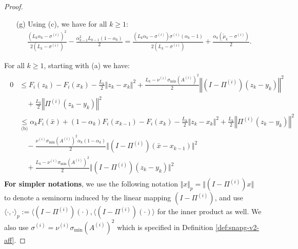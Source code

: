 \documentclass[12pt]{article}
\begin{document}
\begin{proof}
\begin{itemize}
            \item [(g)] Using (c), we have for all $k \ge 1$: 
            \begin{align*}
                \frac{\left(
                    L_k\alpha_k - \sigma^{(i)}
                \right)^2}{2(L_k - \sigma^{(i)})} 
                -
                \frac{\alpha_{k - 1}^2L_{k - 1}(1 - \alpha_k)}{2} 
                = 
                \frac{
                \left(L_k \alpha_k - \sigma^{(i)}\right)\sigma^{(i)}
                \left(\alpha_k - 1\right)
                }
                {2(L_k - \sigma^{(i)})}
                + \frac{\alpha_k(\tilde \mu_k - \sigma^{(i)})}{2}. 
            \end{align*}
        \end{itemize}
        For all $k \ge 1$, starting with (a) we have: 
        \begin{align}\label{ineq:snapg2-one-step-stage1-chain1}
            \begin{split}
                0 &\le F_i(z_k) - F_i(x_k) - 
                \frac{L_k}{2}\Vert z_k - x_k\Vert^2 
                + \frac{L_k - \nu^{(i)}\sigma_{\min}(A^{(i)})^2}{2}\left\Vert (I - \Pi^{(i)}) (z_k - y_k)\right\Vert^2
                    \\ &\quad 
                    + \frac{L_k}{2}\left\Vert \Pi^{(i)}(z_k - y_k)\right\Vert^2
                \\
                &\underset{\text{(b)}}{\le}
                \alpha_k F_i(\bar x) + (1 - \alpha_k)F_i(x_{k - 1}) - F_i(x_k)     
                - \frac{L_k}{2}\Vert z_k - x_k\Vert^2 
                + \frac{L_k}{2}\left\Vert \Pi^{(i)}(z_k - y_k)\right\Vert^2
                    \\&\quad 
                    - \frac{\nu^{(i)}\sigma_{\min}(A^{(i)})^2\alpha_k(1 - \alpha_k)}{2}\Vert (I - \Pi^{(i)})(\bar x - x_{k - 1})\Vert^2
                    \\&\quad
                    + \frac{L_k - \nu^{(i)}\sigma_{\min}(A^{(i)})^2}{2}\Vert (I - \Pi^{(i)})(z_k - y_k)\Vert^2
            \end{split}
        \end{align}
        \textbf{For simpler notations}, we use the following notation $\Vert x\Vert_p = \Vert (I - \Pi^{(i)})x\Vert$ to denote a seminorm induced by the linear mapping $(I - \Pi^{(i)})$, and use $\langle \cdot,\cdot\rangle_p := \langle (I - \Pi^{(i)})(\cdot), \langle (I - \Pi^{(i)})(\cdot)\rangle$ for the inner product as well. 
        We also use $\sigma^{(i)} = \nu^{(i)}\sigma_{\min}(A^{(i)})^2$ which is specified in Definition \ref{def:snapg-v2-aff}. 

\end{proof}
\end{document}

